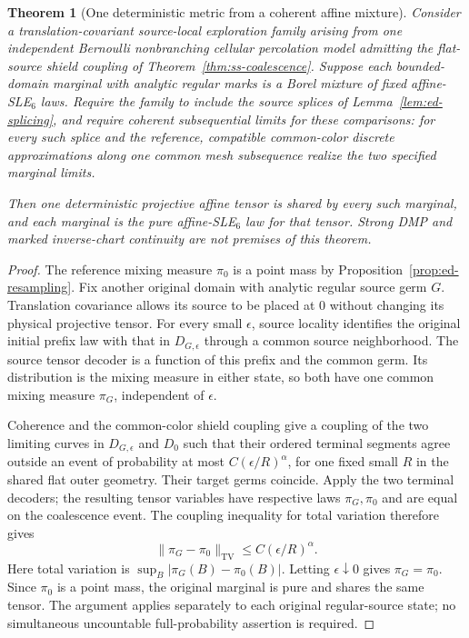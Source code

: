 \documentclass[11pt]{article}
\newtheorem{theorem}{Theorem}[section]
\theoremstyle{definition}\newtheorem{definition}[theorem]{Definition}
\theoremstyle{remark}\newtheorem{remark}[theorem]{Remark}
\begin{document}
\begin{theorem}[One deterministic metric from a coherent affine mixture]
\label{thm:ed-coherent}
Consider a translation-covariant source-local exploration family arising
from one independent Bernoulli nonbranching cellular percolation model
admitting the flat-source shield coupling of
Theorem~\ref{thm:ss-coalescence}. Suppose each bounded-domain marginal
with analytic regular marks is a Borel mixture of fixed affine-SLE$_6$
laws. Require the family to include the source splices of
Lemma~\ref{lem:ed-splicing}, and require coherent subsequential limits
for these comparisons: for every such splice and the reference, compatible
common-color discrete approximations along one common mesh subsequence
realize the two specified marginal limits.

Then one deterministic projective affine tensor is shared by every
such marginal, and each marginal is the pure affine-SLE$_6$ law for
that tensor. Strong DMP and marked inverse-chart continuity are not
premises of this theorem.
\end{theorem}
\begin{proof}
The reference mixing measure $\pi_0$ is a point mass by
Proposition~\ref{prop:ed-resampling}. Fix another original domain with
analytic regular source germ $G$. Translation covariance allows its source
to be placed at $0$ without changing its physical projective tensor.
For every small $\epsilon$, source locality identifies the original
initial prefix law with that in $D_{G,\epsilon}$ through a common source
neighborhood. The source tensor decoder is a function of this prefix
and the common germ. Its distribution is the mixing measure in either
state, so both have one common mixing measure $\pi_G$, independent of
$\epsilon$.

Coherence and the common-color shield coupling give a coupling of the
two limiting curves in $D_{G,\epsilon}$ and $D_0$ such that their ordered
terminal segments agree outside an event of probability at most
$C(\epsilon/R)^\alpha$, for one fixed small $R$ in the shared flat
outer geometry. Their target germs coincide. Apply the two terminal
decoders; the resulting tensor variables have respective laws
$\pi_G,\pi_0$ and are equal on the coalescence event. The coupling
inequality for total variation therefore gives
\[
 \|\pi_G-\pi_0\|_{\mathrm{TV}}
       \leq C(\epsilon/R)^\alpha.
 \tag{ED16}
\]
Here total variation is $\sup_B|\pi_G(B)-\pi_0(B)|$.
Letting $\epsilon\downarrow0$ gives $\pi_G=\pi_0$. Since $\pi_0$ is
a point mass, the original marginal is pure and shares the same tensor.
The argument applies separately to each original regular-source state;
no simultaneous uncountable full-probability assertion is required.
\end{proof}
\end{document}
